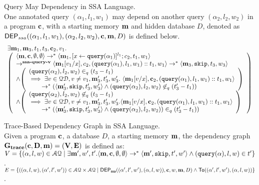 \documentclass[a4paper,11pt]{article}
\begin{document}
\begin{defn}
Query May Dependency in SSA Language.
\\
{
One annotated query $({\alpha}_1, l_1, w_1)$ may depend on another query $({\alpha}_2,l_2, w_2)$ in a program $\mathbf{{c}}$,
with a starting memory $\mathbf{{m}}$ and  hidden database $D$, denoted as 
%
$\mathsf{DEP}_{ssa}({(\alpha_1, l_1, w_1)}, ({\alpha}_2, l_2, w_2), \mathbf{{c}}, \mathbf{{m}}, D)$ is defined below. 
%
%
\[
\begin{array}{l}
\exists \ssa{m}_1,\ssa{m}_3,t_1,t_3,\ssa{c}_2,v_1.\\
  \left (\begin{array}{l}   
\config{\ssa{m}, \ssa{c}, \emptyset ,\emptyset} \rightarrow^{*} 
\config{\ssa{m}_1, [\assign{x}{\query({\alpha}_1)}]^{l_1} ; c_2,
  t_1, w_1} 
\\ 
\rightarrow^{\textbf{{ssa-query-v}}} 
\config{\ssa{m}_1[v_1/x], c_2,
(\query({\alpha}_1),l_1, w_1)::t_1, w_1} \rightarrow^{*} \config{\ssa{m}_3, \eskip,
t_3,w_3}
 \\ \land
  \left( 
  \begin{array}{l}
  (\query({\alpha}_2),l_2,w_2) \in_{q} (t_3-t_1) 
  \\
  \implies 
  \exists v \in \qdom, v \neq v_1, \ssa{m}_3', t_3', w_3'. ~  
  \config{\ssa{m}_1[v/x], {\ssa{c}_2}, (\query({\alpha}_1),l_1, w_1)::t_1, w_1} 
  \\ 
  \quad \quad 
  \rightarrow^{*}
  (\config{\ssa{m}_3', \eskip, t_3', w_3'} 
  \land 
  (\query({\alpha}_2),l_2,w_2) \not \in_{q} (t_3'-t_1))
\end{array} \right )
\\\land
\left( 
  \begin{array}{l}
	(\query({\qval}_2),l_2,w_2) \not\in_{q} (t_3-t_1)
  	\\
  	\implies 
	\exists v \in \qdom, v \neq v_1, \ssa{m}_3', t_3', w_3'. 
	\config{\ssa{m}_1[v/x], {\ssa{c}_2}, (\query({\qval}_1),l_1,w_1)::t_1, w_1}
	\\ 
	\quad \quad 
	\rightarrow^{*} 
	(\config{\ssa{m}_3', \eskip, t_3', w_3'} 
	\land 
	(\query({\qval}_2),l_2,w_2))  \in_{q} (t_3'-t_1))
\end{array} \right )
\end{array} \right )
\end{array}
\]
}
\end{defn}
%
%
\begin{defn}
Trace-Based Dependency Graph in SSA Language.
\\
{
Given a program $\mathbf{{c}}$, a database $D$, a starting memory $\mathbf{{m}}$,
the dependency graph $\bf{G_{trace}}(\mathbf{{c}},D,\mathbf{{m}}) = (V, E)$ is defined as: \\
$V =\{({\alpha}, l, w) \in \mathcal{AQ} 
\mid 
\exists \mathbf{{m'}},  w', t'.  
\langle \mathbf{{m}} ,\mathbf{{c}}, \emptyset, \emptyset \rangle  
\to^{*}  
\langle \mathbf{{m'}} , \mathtt{skip}, t', w'  \rangle  
\land ({\tt query}({\alpha}), l, w) \in {t'}  \}$.
\\
$E = 
\left\{
	(({\qval},l, w), ({\qval}',l',w')) \in \mathcal{AQ} \times \mathcal{AQ}
	\mid 
	\mathsf{DEP_{ssa}}(({\qval}',l',w'),({\qval},l,w)), \ssa{c},w,\ssa{m},D)     
	\land 
	\mathsf{To}(({\qval}',l',w'),({\qval},l,w))
\right\}$.
}
\end{defn}
\end{document}
